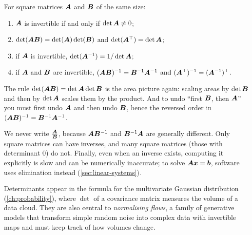 \begin{theorem}\label{thm:det-properties}
For square matrices $\bm{A}$ and $\bm{B}$ of the same size:
\begin{enumerate}
  \item $\bm{A}$ is invertible if and only if $\det\bm{A} \neq 0$;
  \item $\det(\bm{A}\bm{B}) = \det(\bm{A})\det(\bm{B})$ and $\det(\bm{A}^\top) = \det\bm{A}$;
  \item if $\bm{A}$ is invertible, $\det(\bm{A}^{-1}) = 1/\det\bm{A}$;
  \item if $\bm{A}$ and $\bm{B}$ are invertible, $(\bm{A}\bm{B})^{-1} = \bm{B}^{-1}\bm{A}^{-1}$
    and $(\bm{A}^\top)^{-1} = (\bm{A}^{-1})^\top$.
\end{enumerate}
\end{theorem}

The rule $\det(\bm{A}\bm{B}) = \det\bm{A}\det\bm{B}$ is the area picture again: scaling
areas by $\det\bm{B}$ and then by $\det\bm{A}$ scales them by the product. And to
undo ``first $\bm{B}$, then $\bm{A}$'' you must first undo $\bm{A}$ and then undo
$\bm{B}$, hence the reversed order in $(\bm{A}\bm{B})^{-1} = \bm{B}^{-1}\bm{A}^{-1}$.

\begin{pitfall}
We never write $\frac{\bm{A}}{\bm{B}}$, because $\bm{A}\bm{B}^{-1}$ and $\bm{B}^{-1}\bm{A}$ are
generally different. Only square matrices can have inverses, and many square
matrices (those with determinant $0$) do not. Finally, even when an inverse
exists, computing it explicitly is slow and can be numerically inaccurate; to
solve $\bm{A}\bm{x} = \bm{b}$, software uses elimination instead
(\cref{sec:linear-systems}).
\end{pitfall}

\begin{mlnote}
Determinants appear in the formula for the multivariate Gaussian distribution
(\cref{ch:probability}), where $\det$ of a covariance matrix measures the
volume of a data cloud. They are also central to \emph{normalising flows}, a
family of generative models that transform simple random noise into complex
data with invertible maps and must keep track of how volumes change.
\end{mlnote}

\sectionexercises

